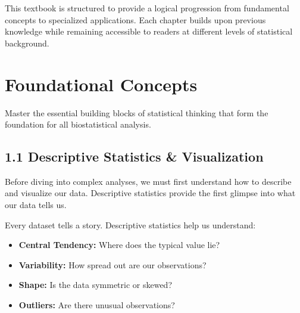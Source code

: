 \documentclass[
  11pt,
  letterpaper,
  oneside]{book}
\providecommand{\tightlist}{%
  \setlength{\itemsep}{0pt}\setlength{\parskip}{0pt}}\usepackage{longtable,booktabs,array}
\begin{document}
This textbook is structured to provide a logical progression from
fundamental concepts to specialized applications. Each chapter builds
upon previous knowledge while remaining accessible to readers at
different levels of statistical background.


\chapter{Foundational Concepts}\label{foundational-concepts}

Master the essential building blocks of statistical thinking that form
the foundation for all biostatistical analysis.

\section{1.1 Descriptive Statistics \&
Visualization}\label{descriptive-statistics-visualization}

Before diving into complex analyses, we must first understand how to
describe and visualize our data. Descriptive statistics provide the
first glimpse into what our data tells us.

\begin{tcolorbox}[enhanced jigsaw, coltitle=black, left=2mm, colback=white, title=\textcolor{quarto-callout-note-color}{\faInfo}\hspace{0.5em}{Understanding Your Data}, opacitybacktitle=0.6, titlerule=0mm, bottomtitle=1mm, colbacktitle=quarto-callout-note-color!10!white, colframe=quarto-callout-note-color-frame, breakable, bottomrule=.15mm, opacityback=0, toptitle=1mm, rightrule=.15mm, leftrule=.75mm, arc=.35mm, toprule=.15mm]

Every dataset tells a story. Descriptive statistics help us understand:

\begin{itemize}
\tightlist
\item
  \textbf{Central Tendency:} Where does the typical value lie?
\item
  \textbf{Variability:} How spread out are our observations?
\item
  \textbf{Shape:} Is the data symmetric or skewed?
\item
  \textbf{Outliers:} Are there unusual observations?
\end{itemize}

\end{tcolorbox}
\end{document}
